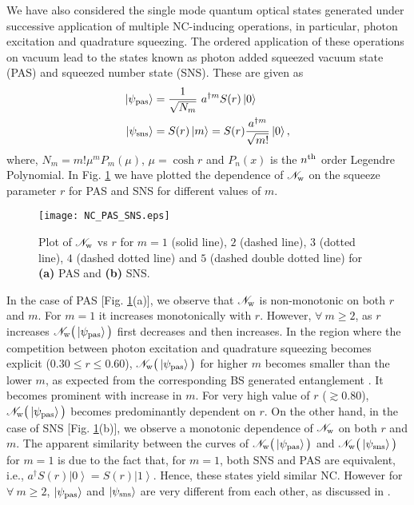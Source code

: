 \documentclass[letter,scriptaddress,twocolumn,prl,showkeys]{revtex4}
\newcommand{\ket}[1]{\left| #1 \right\rangle}
\begin{document}
We have also considered the single mode quantum optical states generated under successive application of multiple NC-inducing operations, in particular, photon excitation and quadrature squeezing. 
The ordered application of these operations on vacuum lead to the states known as photon added squeezed vacuum state (PAS) and squeezed number state (SNS). 
These are given as
\begin{align}
\ket{\psi_{\rm{pas}}}&= \frac{1}{\sqrt{N_{m}}}~a^{\dagger m} S(r) \ket 0 \nonumber \\
\ket{\psi_{\rm{sns}}}&= S(r) \ket m = S(r) \frac{a^{\dagger m}}{\sqrt{m!}} \ket 0,
\label{eq_psi_pas_sns}
\end{align}
where, $N_{m}= m! \mu^{m} P_{m}(\mu)$, $\mu=\cosh r$ and $P_{n}(x)$ is the $n^{\rm{th}}$ order Legendre Polynomial.
In Fig. \ref{fig_ncwe_pas_sns} we have plotted the dependence of $\mathscr{N}_{\rm{w}}$ on the squeeze parameter $r$ for PAS and SNS for different values of $m$.
\begin{figure}[h!]
\texttt{[image: NC\_PAS\_SNS.eps]}
\caption{Plot of $\mathscr{N}_{\rm{w}}$ vs $r$ for $m=1$ (solid line), $2$ (dashed line), $3$ (dotted line), $4$ (dashed dotted line) and $5$ (dashed double dotted line) for {\bf (a)} PAS and {\bf (b)} SNS.}
\label{fig_ncwe_pas_sns}
\end{figure}

In the case of PAS [Fig. \ref{fig_ncwe_pas_sns}(a)], we observe that $\mathscr{N}_{\rm{w}}$ is non-monotonic on both $r$ and $m$. 
For $m=1$ it increases monotonically with $r$. 
However, $\forall~ m\geq 2$, as $r$ increases $\mathscr{N}_{\rm{w}}\big(\ket{\psi_{\rm{pas}}} \big)$ first decreases and then increases. 
In the region where the competition between photon excitation and quadrature squeezing becomes explicit ($0.30\leq r\leq 0.60$), $\mathscr{N}_{\rm{w}}\big(\ket{\psi_{\rm{pas}}} \big)$ for higher $m$ becomes smaller than the lower $m$, as expected from the corresponding BS generated entanglement \cite{nc_bsent_bose_kumar}. 
It becomes prominent with increase in $m$. 
For very high value of $r$ ($\gtrsim 0.80$), $\mathscr{N}_{\rm{w}}\big(\ket{\psi_{\rm{pas}}} \big)$ becomes predominantly dependent on $r$. 
On the other hand, in the case of SNS [Fig. \ref{fig_ncwe_pas_sns}(b)], we observe a monotonic dependence of $\mathscr{N}_{\rm{w}}$ on both $r$ and $m$. 
The apparent similarity between the curves of $\mathscr{N}_{\rm{w}}\big(\ket{\psi_{\rm{pas}}} \big)$ and $\mathscr{N}_{\rm{w}}\big(\ket{\psi_{\rm{sns}}} \big)$ for $m=1$ is due to the fact that, for $m=1$, both SNS and PAS are equivalent, i.e., $a^{\dagger}S(r)\ket 0=S(r)\ket 1$.
Hence, these states yield similar NC.
However for $\forall~ m\geq 2$, $\ket{\psi_{\rm{pas}}}$ and $\ket{\psi_{\rm{sns}}}$ are very different from each other, as discussed in \cite{nc_bsent_bose_kumar}.
\end{document}

